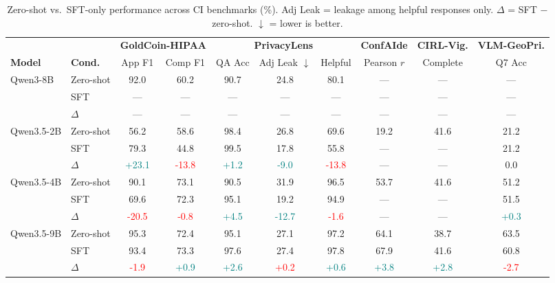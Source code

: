 \begin{table}[t]
\centering
\caption{Zero-shot vs.\ SFT-only performance across CI benchmarks (\%). Adj Leak = leakage among helpful responses only. $\Delta$ = SFT $-$ zero-shot. $\downarrow$ = lower is better.}
\label{tab:zero-shot-vs-sft}
\begin{tabular}{llcccccccc}
\toprule
 &  & \multicolumn{2}{c}{\textbf{GoldCoin-HIPAA}} & \multicolumn{3}{c}{\textbf{PrivacyLens}} & \multicolumn{1}{c}{\textbf{ConfAIde}} & \multicolumn{1}{c}{\textbf{CIRL-Vig.}} & \multicolumn{1}{c}{\textbf{VLM-GeoPri.}} \\
\cmidrule(lr){3-4} \cmidrule(lr){5-7} \cmidrule(lr){8-8} \cmidrule(lr){9-9} \cmidrule(lr){10-10}
\textbf{Model} & \textbf{Cond.} & App F1 & Comp F1 & QA Acc & Adj Leak $\downarrow$ & Helpful & Pearson $r$ & Complete & Q7 Acc \\
\midrule
Qwen3-8B & Zero-shot & 92.0 & 60.2 & 90.7 & 24.8 & 80.1 & --- & --- & --- \\
 & SFT & --- & --- & --- & --- & --- & --- & --- & --- \\
 & $\Delta$ & --- & --- & --- & --- & --- & --- & --- & --- \\
\addlinespace
Qwen3.5-2B & Zero-shot & 56.2 & 58.6 & 98.4 & 26.8 & 69.6 & 19.2 & 41.6 & 21.2 \\
 & SFT & 79.3 & 44.8 & 99.5 & 17.8 & 55.8 & --- & --- & 21.2 \\
 & $\Delta$ & \textcolor{teal}{+23.1} & \textcolor{red}{-13.8} & \textcolor{teal}{+1.2} & \textcolor{teal}{-9.0} & \textcolor{red}{-13.8} & --- & --- & 0.0 \\
\addlinespace
Qwen3.5-4B & Zero-shot & 90.1 & 73.1 & 90.5 & 31.9 & 96.5 & 53.7 & 41.6 & 51.2 \\
 & SFT & 69.6 & 72.3 & 95.1 & 19.2 & 94.9 & --- & --- & 51.5 \\
 & $\Delta$ & \textcolor{red}{-20.5} & \textcolor{red}{-0.8} & \textcolor{teal}{+4.5} & \textcolor{teal}{-12.7} & \textcolor{red}{-1.6} & --- & --- & \textcolor{teal}{+0.3} \\
\addlinespace
Qwen3.5-9B & Zero-shot & 95.3 & 72.4 & 95.1 & 27.1 & 97.2 & 64.1 & 38.7 & 63.5 \\
 & SFT & 93.4 & 73.3 & 97.6 & 27.4 & 97.8 & 67.9 & 41.6 & 60.8 \\
 & $\Delta$ & \textcolor{red}{-1.9} & \textcolor{teal}{+0.9} & \textcolor{teal}{+2.6} & \textcolor{red}{+0.2} & \textcolor{teal}{+0.6} & \textcolor{teal}{+3.8} & \textcolor{teal}{+2.8} & \textcolor{red}{-2.7} \\

\end{tabular}
\end{table}
